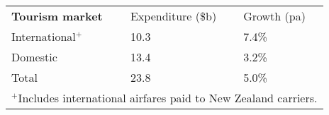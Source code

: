\begin{tabular}[t]{p{4.2cm}>{\hfill}p{1.9cm}>{\hfill}p{1.4cm}}
 \textbf{Tourism market} & Expenditure (\$b) & Growth (pa) \\ 
 International$^+$ & 10.3 & 7.4\% \\ 
  Domestic & 13.4 & 3.2\% \\ 
  Total & 23.8 & 5.0\% \\ 
  \multicolumn{3}{p{7.5cm}}{$^+$Includes international airfares paid to New Zealand carriers.}\ 
\end{tabular}
